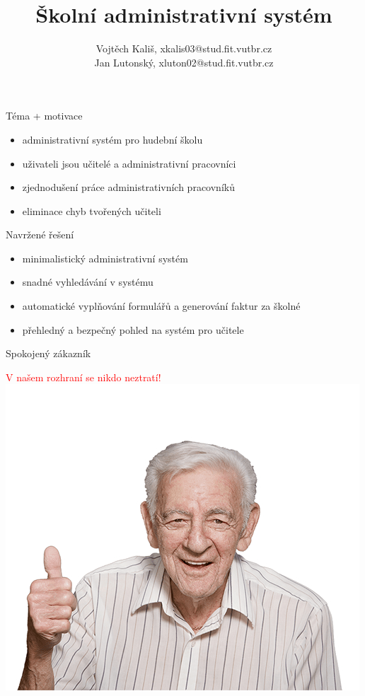 \documentclass[11pt]{beamer}
\author{Vojtěch Kališ,   xkalis03@stud.fit.vutbr.cz \\
            Jan Lutonský,   xluton02@stud.fit.vutbr.cz}
\title{Školní administrativní systém}
\date{}
\begin{document}
	\begin{frame}
		\titlepage
	\end{frame}
	\begin{frame}{Téma + motivace}
		\begin{itemize}
			\item administrativní systém pro hudební školu
			\item uživateli jsou učitelé a administrativní pracovníci
			\item zjednodušení práce administrativních pracovníků
			\item eliminace chyb tvořených učiteli
		\end{itemize}
	\end{frame}
	\begin{frame}{Navržené řešení}
		\begin{itemize}
			\item minimalistický administrativní systém
			\item snadné vyhledávání v systému
			\item automatické vyplňování formulářů a generování faktur za školné
			\item přehledný a bezpečný pohled na systém pro učitele
		\end{itemize}
	\end{frame}
	\begin{frame}{Spokojený zákazník}
		\begin{center}
			\textcolor{red}{V našem rozhraní se nikdo neztratí!} \\
			\vspace*{-1cm}
			\includegraphics[scale=0.5]{img/old-person.png}
		\end{center}
	\end{frame}
\end{document}

